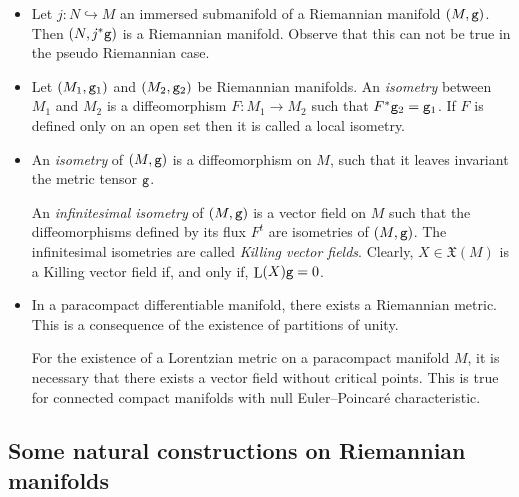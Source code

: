 \documentclass[12pt]{report}
\def\vf{\mathfrak X}
\def\Lie{\mathop{\rm L}\nolimits}
\begin{document}
\begin{itemize}
\item
Let ${\mathit j}\colon N\hookrightarrow M$ 
an immersed submanifold of a Riemannian manifold $(M,{\tt g})$. 
Then $(N,{\mathit j}^*{\tt g})$ is a Riemannian manifold. 
Observe that this can not be true in the pseudo Riemannian case.
\item
Let $(M_1,{\tt g}_1)$ and $(M_2,{\tt g}_2)$ be Riemannian manifolds. 
An {\sl isometry} between $M_1$ and $M_2$ is a diffeomorphism 
$F\colon M_1\to M_2$ such that $F^*{\tt g}_2={\tt g}_1$. 
If $F$ is defined only on an open set then it is called a local isometry.
\item 
An {\sl isometry} of $(M,{\tt g})$ is a diffeomorphism on $M$, such that it leaves invariant the metric tensor ${\tt g}$.

An {\sl infinitesimal isometry} of $(M,{\tt g})$ is a vector field on $M$ 
such that the diffeomorphisms defined by its flux $F^t$ 
are isometries of $(M,{\tt g})$.
The infinitesimal isometries are called {\sl Killing vector fields}.
Clearly, $X\in\vf(M)$ is a Killing vector field if, and only if, $\Lie(X){\tt g}=0$.
\item 
In a paracompact differentiable manifold, there exists a Riemannian metric. This is a consequence of the existence of partitions of unity.
 
For the existence of a Lorentzian metric on a paracompact manifold $M$,
it is necessary that there exists a vector field without critical points. 
This is true for connected compact manifolds with null Euler--Poincar\'e characteristic.
\end{itemize}


\subsection{Some natural constructions on Riemannian manifolds}
\end{document}
